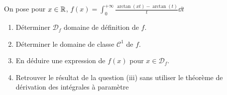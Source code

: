 \begin{exo}
	\label{intgen1}
	On pose pour $x\in\operatorname{\mathbb R}$, $f(x)=\int_0^{+\infty}\frac{\arctan(xt)-\arctan(t)}t\dd t$
	\begin{enumerate}
		\item Déterminer $\mathcal D_f$ domaine de définition de $f$.
		\item Déterminer le domaine de classe $\mathcal C^1$ de $f$.
		\item En déduire une expression de $f(x)$ pour $x\in\mathcal D_f$.
		\item Retrouver le résultat de la question (iii) sans utiliser le théorème de dérivation des intégrales à paramètre\\
	\end{enumerate}
\end{exo}

